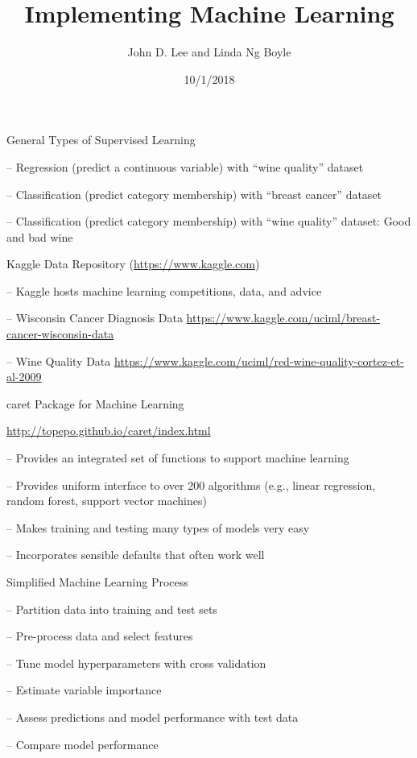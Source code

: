 \documentclass[ignorenonframetext,]{beamer}
\title{Implementing Machine Learning}
\author{John D. Lee and Linda Ng Boyle}
\date{10/1/2018}
\begin{document}
\frame{\titlepage}

\begin{frame}

\end{frame}

\begin{frame}{General Types of Supervised Learning}

-- Regression (predict a continuous variable) with ``wine quality''
dataset

-- Classification (predict category membership) with ``breast cancer''
dataset

-- Classification (predict category membership) with ``wine quality''
dataset: Good and bad wine

\end{frame}

\begin{frame}{Kaggle Data Repository (\url{https://www.kaggle.com})}

-- Kaggle hosts machine learning competitions, data, and advice

-- Wisconsin Cancer Diagnosis Data
\url{https://www.kaggle.com/uciml/breast-cancer-wisconsin-data}

-- Wine Quality Data
\url{https://www.kaggle.com/uciml/red-wine-quality-cortez-et-al-2009}

\end{frame}

\begin{frame}{caret Package for Machine Learning}

\url{http://topepo.github.io/caret/index.html}

-- Provides an integrated set of functions to support machine learning

-- Provides uniform interface to over 200 algorithms (e.g., linear
regression, random forest, support vector machines)

-- Makes training and testing many types of models very easy

-- Incorporates sensible defaults that often work well

\end{frame}

\begin{frame}{Simplified Machine Learning Process}

-- Partition data into training and test sets

-- Pre-process data and select features

-- Tune model hyperparameters with cross validation

-- Estimate variable importance

-- Assess predictions and model performance with test data

-- Compare model performance

\end{frame}
\end{document}

